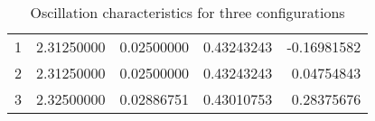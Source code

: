 \begin{table}[htbp]
\caption{Oscillation characteristics for three configurations}
\begin{tabular}{rrrrr}
\toprule
1 & 2.31250000 & 0.02500000 & 0.43243243 & -0.16981582 \\
2 & 2.31250000 & 0.02500000 & 0.43243243 & 0.04754843 \\
3 & 2.32500000 & 0.02886751 & 0.43010753 & 0.28375676 \\
\bottomrule
\end{tabular}
\end{table}
